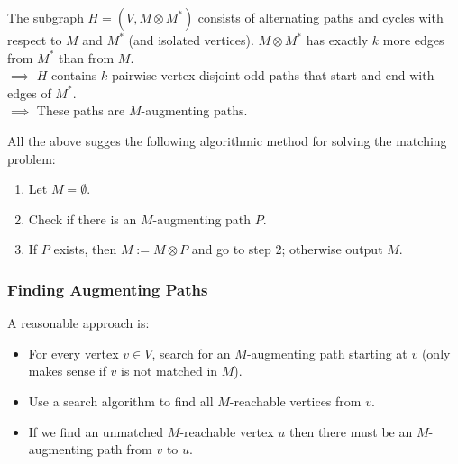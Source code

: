 {The subgraph \(H=(V,M \otimes M^*)\) consists of alternating paths and cycles with respect to \(M\) and \(M^*\) (and isolated vertices).
\(M \otimes M^*\) has exactly \(k\) more edges from \(M^*\) than from \(M\).
\\\(\implies\) \(H\) contains \(k\) pairwise vertex-disjoint odd paths that start and end with edges of \(M^*\).
\\\(\implies\) These paths are \(M\)-augmenting paths.}

All the above sugges the following algorithmic method for solving the matching problem:
\begin{enumerate}
    \item Let \(M = \emptyset\).
    \item Check if there is an \(M\)-augmenting path \(P\).
    \item If \(P\) exists, then \(M := M \otimes P\) and go to step 2; otherwise output \(M\).
\end{enumerate}

\subsubsection{Finding Augmenting Paths}


A reasonable approach is:
\begin{itemize}
    \item For every vertex \(v \in V\), search for an \(M\)-augmenting path starting at \(v\) (only makes sense if \(v\) is not matched in \(M\)).
    \item Use a search algorithm to find all \(M\)-reachable vertices from \(v\).
    \item If we find an unmatched \(M\)-reachable vertex \(u\) then there must be an \(M\)-augmenting path from \(v\) to \(u\).
\end{itemize}

